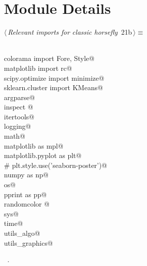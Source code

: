 \documentclass[11.5pt]{report}
\begin{document}
\section{Module Details}

\newchunk 

\begin{flushleft} \small\label{scrap23}\raggedright\small
{} $\langle\,${\itshape Relevant imports for classic horsefly}\nobreak\ {\footnotesize {21b}}$\,\rangle\equiv$
\vspace{-1ex}
\begin{list}{}{} \item
\mbox{}\verb@@\\
\mbox{}\verb@from colorama import Fore, Style@\\
\mbox{}\verb@from matplotlib import rc@\\
\mbox{}\verb@from scipy.optimize import minimize@\\
\mbox{}\verb@from sklearn.cluster import KMeans@\\
\mbox{}\verb@import argparse@\\
\mbox{}\verb@import inspect @\\
\mbox{}\verb@import itertools@\\
\mbox{}\verb@import logging@\\
\mbox{}\verb@import math@\\
\mbox{}\verb@import matplotlib as mpl@\\
\mbox{}\verb@import matplotlib.pyplot as plt@\\
\mbox{}\verb@# plt.style.use('seaborn-poster')@\\
\mbox{}\verb@import numpy as np@\\
\mbox{}\verb@import os@\\
\mbox{}\verb@import pprint as pp@\\
\mbox{}\verb@import randomcolor @\\
\mbox{}\verb@import sys@\\
\mbox{}\verb@import time@\\
\mbox{}\verb@import utils_algo@\\
\mbox{}\verb@import utils_graphics@\\
\mbox{}\verb@@{\NWsep}
\end{list}
\vspace{-1.5ex}
\footnotesize
\begin{list}{}{\setlength{\itemsep}{-\parsep}\setlength{\itemindent}{-\leftmargin}}
\item \NWtxtMacroRefIn\ .

\item{}
\end{list}
\vspace{4ex}
\end{flushleft}
\end{document}
